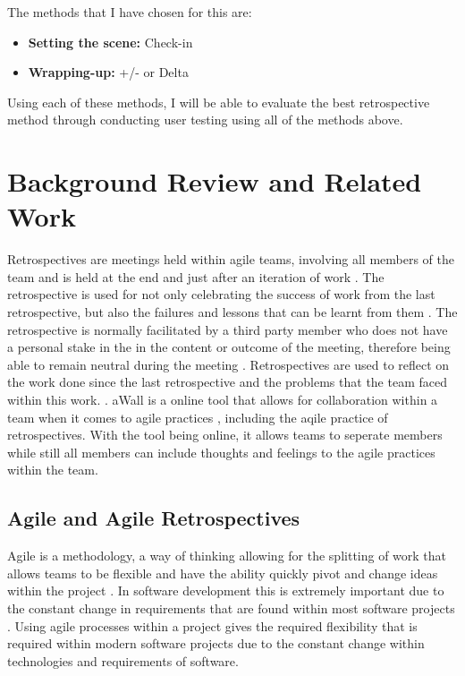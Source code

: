 \documentclass[11pt
              , a4paper
              , twoside
              , openright
              ]{report}
\begin{document}
The methods that I have chosen for this are:  \cite{AgileRetrospectivesEstherDerby}
\begin{itemize}
	\item \textbf{Setting the scene:} Check-in
	\item \textbf{Wrapping-up:} +/- or Delta
\end{itemize}

Using each of these methods, I will be able to evaluate the best retrospective method through conducting user testing using all of the methods above.

\chapter{Background Review and Related Work}\label{C:background}
Retrospectives are meetings held within agile teams, involving all members of the team and is held at the end and just after an iteration of work \cite{AgileRetrospectivesEstherDerby,GettingValueFromRetrospectives}. The retrospective is used for not only celebrating the success of work from the last retrospective, but also the failures and lessons that can be learnt from them \cite {normanKeith}. The retrospective is normally facilitated by a third party member who does not have a personal stake in the in the content or outcome of the meeting, therefore being able to remain neutral during the meeting \cite{normanKeith,retrospectiveFacilator}. Retrospectives are used to reflect on the work done since the last retrospective and the problems that the team faced within this work. \cite{AgileRetrospectivesEstherDerby}. aWall is a online tool that allows for collaboration within a team when it comes to agile practices \cite{xp2017_aWall}, including the aqile practice of retrospectives. With the tool being online, it allows teams to seperate members while still all members can include thoughts and feelings to the agile practices within the team.  

\section{Agile and Agile Retrospectives}
Agile is a methodology, a way of thinking allowing for the splitting of work that allows teams to be flexible and have the ability quickly pivot and change ideas within the project \cite{agile_2013}. In software development this is extremely important due to the constant change in requirements that are found within most software projects \cite{10.1007/978-3-642-15666-3_6}. Using agile processes within a project gives the required flexibility that is required within modern software projects due to the constant change within technologies and requirements of software.
\end{document}
